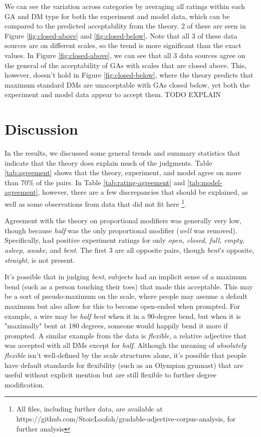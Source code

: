 \documentclass[11pt]{article}
\begin{document}
We can see the variation across categories by averaging all ratings within each GA and DM type for both the experiment and model data, which can be compared to the predicted acceptability from the theory. 2 of these are seen in Figure \ref{fig:closed-above} and \ref{fig:closed-below}. Note that all 3 of these data sources are on different scales, so the trend is more significant than the exact values. In Figure \ref{fig:closed-above}, we can see that all 3 data sources agree on the general of the acceptability of GAs with scales that are closed above. This, however, doesn't hold in Figure \ref{fig:closed-below}, where the theory predicts that maximum standard DMs are unacceptable with GAs closed below, yet both the experiment and model data appear to accept them. TODO EXPLAIN

\section{Discussion}

In the results, we discussed some general trends and summary statistics that indicate that the theory does explain much of the judgments. Table \ref{tab:agreement} shows that the theory, experiment, and model agree on more than 70\% of the pairs. In Table \ref{tab:rating-agreement} and \ref{tab:model-agreement}, however, there are a few discrepancies that should be explained, as well as some observations from data that did not fit here \footnote{All files, including further data, are available at https://github.com/StoicLoofah/gradable-adjective-corpus-analysis, for further analysis}.

Agreement with the theory on proportional modifiers was generally very low, though because \textit{half} was the only proportional modifier (\textit{well} was removed). Specifically,  had positive experiment ratings for only \textit{open, closed, full, empty, asleep, awake,} and \textit{bent}. The first 3 are all opposite pairs, though \textit{bent}'s opposite, \textit{straight}, is not present. 

It's possible that in judging \textit{bent}, subjects had an implicit sense of a maximum bend (such as a person touching their toes) that made this acceptable. This may be a sort of pseudo-maximum on the scale, where people may assume a default maximum but also allow for this to become open-ended when prompted. For example, a wire may be \textit{half bent} when it in a 90-degree bend, but when it is "maximally" bent at 180 degrees, someone would happily bend it more if prompted. A similar example from the data is \textit{flexible}, a relative adjective that was accepted with all DMs except for \textit{half}. Although the meaning of \textit{absolutely flexible} isn't well-defined by the scale structures alone, it's possible that people have default standards for flexibility (such as an Olympian gymnast) that are useful without explicit mention but are still flexible to further degree modification.
\end{document}
